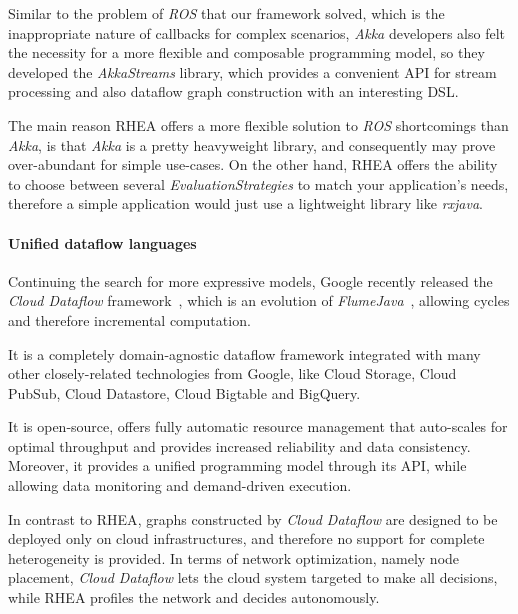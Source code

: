 \documentclass[sigplan,review,anonymous]{acmart}
\begin{document}
Similar to the problem of \textit{ROS} that our framework solved, which is the
inappropriate nature of callbacks for complex scenarios, \textit{Akka}
developers also felt the necessity for a more flexible and composable
programming model, so they developed the \textit{AkkaStreams} library, which
provides a convenient API for stream processing and also dataflow graph
construction with an interesting DSL.

The main reason \textsc{RHEA} offers a more flexible solution to \textit{ROS}
shortcomings than \textit{Akka}, is that \textit{Akka} is a pretty heavyweight
library, and consequently may prove over-abundant for simple use-cases. On the
other hand, \textsc{RHEA} offers the ability to choose between several
\textit{EvaluationStrategies} to match your application's needs, therefore a
simple application would just use a lightweight library like \textit{rxjava}.

\paragraph{Unified dataflow languages}

Continuing the search for more expressive models, Google recently released the
\textit{Cloud Dataflow} framework~\cite{googledataflow},
which is an evolution of \textit{FlumeJava}~\cite{flumejava}, allowing cycles and
therefore incremental computation.

It is a completely domain-agnostic dataflow framework integrated with many other
closely-related technologies from Google, like Cloud Storage, Cloud PubSub,
Cloud Datastore, Cloud Bigtable and BigQuery.

It is open-source, offers fully automatic resource management that auto-scales
for optimal throughput and provides increased reliability and data consistency.
Moreover, it provides a unified programming model through its API, while
allowing data monitoring and demand-driven execution.

In contrast to \textsc{RHEA}, graphs constructed by \textit{Cloud Dataflow} are
designed to be deployed only on cloud infrastructures, and therefore no support
for complete heterogeneity is provided. In terms of network optimization, namely
node placement,  \textit{Cloud Dataflow} lets the cloud system targeted to make
all decisions, while \textsc{RHEA} profiles the network and decides
autonomously.
\end{document}
